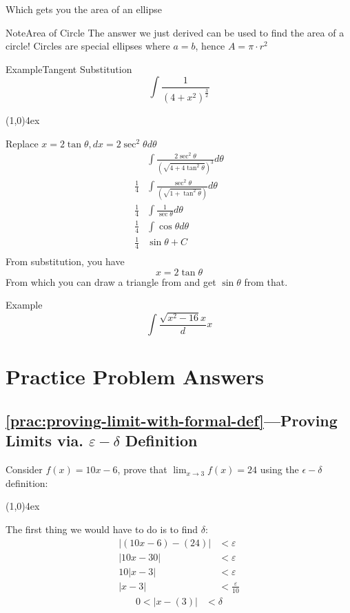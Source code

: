 \documentclass{MathNotes}
\newenvironment{example}[1]{\begin{BlueBox}{Example}{#1}}{\end{BlueBox}}
\newenvironment{note}[1]{\begin{YellowBox}{Note}{#1}}{\end{YellowBox}}
\newcommand{\br}{
	\begin{center}
		\line(1,0){4ex}
	\end{center}}
\begin{document}
Which gets you the area of an ellipse

\begin{note}{Area of Circle}
	The answer we just derived can be used to find the area of a circle!
	Circles are special ellipses where $a=b$, hence $A=\pi\cdot r^2$
\end{note}

\begin{example}{Tangent Substitution}
	\[\int\frac{1}{\left(4+x^2\right)^\frac{3}{2}}\]
	\br
	Replace $x=2\tan\theta,dx=2\sec^2\theta d\theta$
	\begin{align*}
		            & \int\frac{2\sec^2\theta}{\left(\sqrt{4+4\tan^2\theta}\right)^3}d\theta \\
		\frac{1}{4} & \int\frac{\sec^2\theta}{\left(\sqrt{1+\tan^2\theta}\right)}d\theta     \\
		\frac{1}{4} & \int\frac{1}{\sec\theta}d\theta                                        \\
		\frac{1}{4} & \int\cos\theta d\theta                                                 \\
		\frac{1}{4} & \sin\theta+C                                                           \\
	\end{align*}
	From substitution, you have
	\[x=2\tan\theta\]
	From which you can draw a triangle from and get $\sin\theta$ from that.
\end{example}

\begin{example}{}
	\[\int\frac{\sqrt{x^2-16}{x}}dx\]
\end{example}

\newpage
\section{Practice Problem Answers}

\subsection*{\ref{prac:proving-limit-with-formal-def}---Proving Limits via. $\varepsilon-\delta$ Definition}
\label{ans:proving-limit-with-formal-def}
Consider $f(x)=10x-6$, prove that $\displaystyle\lim_{x\to 3}f(x)=24$ using the
$\epsilon-\delta$ definition:
\br
The first thing we would have to do is to find $\delta$:
\begin{align*}
	\lvert (10x-6)-(24) \rvert & <\varepsilon            \\
	\lvert 10x-30 \rvert       & <\varepsilon            \\
	10\lvert x-3 \rvert        & <\varepsilon            \\
	\lvert x-3 \rvert          & <\frac{\varepsilon}{10}
\end{align*}
\begin{align*}
	0 < \lvert x - (3)\rvert & < \delta
\end{align*}
\end{document}
